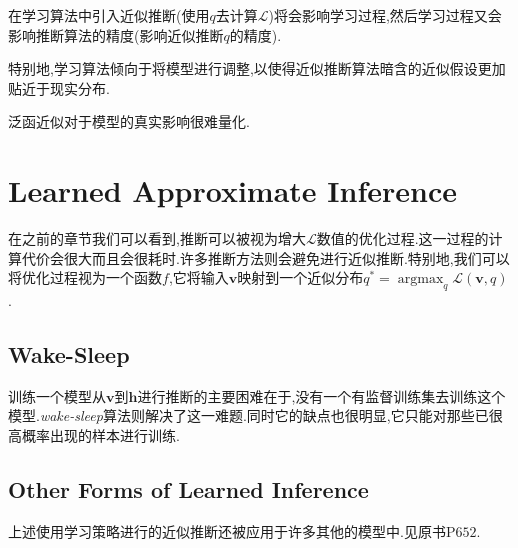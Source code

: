 在学习算法中引入近似推断(使用$q$去计算$\mathcal L$)将会影响学习过程,然后学习过程又会影响推断算法的精度(影响近似推断$q$的精度).

特别地,学习算法倾向于将模型进行调整,以使得近似推断算法暗含的近似假设更加贴近于现实分布.

泛函近似对于模型的真实影响很难量化.

\section{Learned Approximate Inference}

在之前的章节我们可以看到,推断可以被视为增大$\mathcal L$数值的优化过程.这一过程的计算代价会很大而且会很耗时.许多推断方法则会避免进行近似推断.特别地,我们可以将优化过程视为一个函数$f$,它将输入$\bm v$映射到一个近似分布$q^\ast=\mathop{\arg\max}_q\mathcal L(\bm v,q)$.

\subsection{Wake-Sleep}

训练一个模型从$\bm v$到$\bm h$进行推断的主要困难在于,没有一个有监督训练集去训练这个模型.\textit{wake-sleep}算法则解决了这一难题.同时它的缺点也很明显,它只能对那些已很高概率出现的样本进行训练.

\subsection{Other Forms of Learned Inference}

上述使用学习策略进行的近似推断还被应用于许多其他的模型中.见原书P$652$.